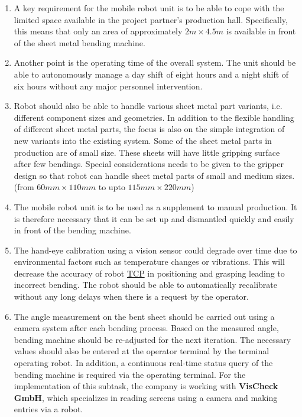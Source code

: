 \begin{enumerate}
    \item A key requirement for the mobile robot unit is to be able to cope with the limited space available in the
    project partner's production hall. Specifically, this means that only an area of approximately $2 m \times 4.5 m$ is
    available in front of the sheet metal bending machine.

    \item Another point is the operating time of the overall system. The unit should be able to autonomously
    manage a day shift of eight hours and a night shift of six hours without any major personnel
    intervention.

    \item Robot should also be able to handle various sheet metal part variants, i.e. different component sizes and
    geometries. In addition to the flexible handling of different sheet metal parts, the focus is also on the
    simple integration of new variants into the existing system. Some of the sheet metal parts in production are
    of small size. These sheets will have little gripping surface after few bendings. Special considerations needs to be given to the
    gripper design so that robot can handle sheet metal parts of small and medium sizes. (from $60 mm \times 110 mm$ to upto $115 mm \times 220 mm$)
  
    \item 
    The mobile robot unit is to be used as a supplement to manual production. It is therefore necessary
    that it can be set up and dismantled quickly and easily in front of the bending machine.

    \item The hand-eye calibration using a vision sensor could degrade over time due to environmental factors such as temperature changes or vibrations. \cite{Bahadir2024}
    This will decrease the accuracy of robot \hyperref[acro:TCP]{TCP} in positioning and grasping leading to incorrect bending.
    The robot should be able to automatically recalibrate without any long delays when there is a request by the operator.
    
    \item The angle measurement on the bent sheet should be carried out using a camera system
    after each bending process. Based on the measured angle, bending machine should be re-adjusted for the next iteration. The
    necessary values should also be entered at the operator terminal by the terminal operating robot. In addition, a
    continuous real-time status query of the bending machine is required via the operating terminal. For
    the implementation of this subtask, the company is working with \textbf{VisCheck GmbH}, which specializes in
    reading screens using a camera and making entries via a robot.
    
\end{enumerate}






